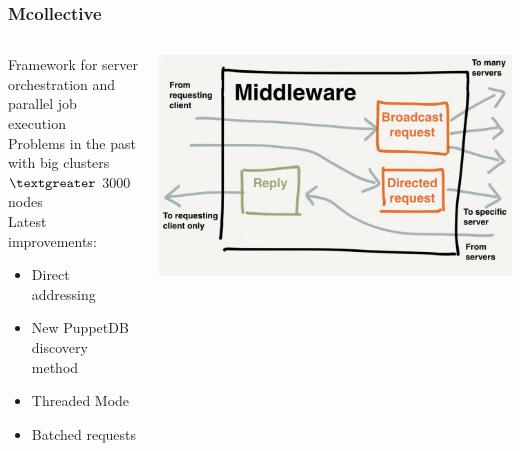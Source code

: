 \documentclass[aspectratio=169]{beamer}
\begin{document}
\begin{frame}
    \frametitle{Mcollective}
    \begin{minipage}[T]{0.95\textwidth}
        \begin{columns}
            \begin{column}{0.5\textwidth}
                Framework for server orchestration and parallel 
                job execution \\[2em]

                Problems in the past with big clusters \\
                $\textgreater$ 3000 nodes \\[2em]

                Latest improvements:
                \begin{itemize}                
                    \item Direct addressing
                    \item New PuppetDB discovery method
                    \item Threaded Mode
                    \item Batched requests
                \end{itemize}
            \end{column}
            \begin{column}{0.5\textwidth}
            \includegraphics[width=1.1\textwidth]{mco.png}
            \end{column}
        \end{columns}
   \end{minipage} 
\end{frame}

\end{document}
